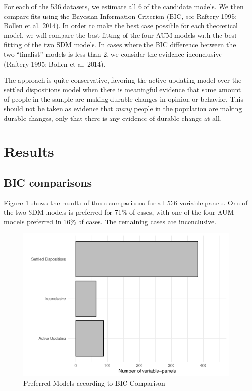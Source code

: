 \documentclass[
  11pt,
]{article}
\begin{document}
For each of the 536 datasets, we estimate all 6 of the candidate models. We then compare fits using the Bayesian Information Criterion (BIC, see Raftery 1995; Bollen et al. 2014). In order to make the best case possible for each theoretical model, we will compare the best-fitting of the four AUM models with the best-fitting of the two SDM models. In cases where the BIC difference between the two ``finalist'' models is less than 2, we consider the evidence inconclusive (Raftery 1995; Bollen et al. 2014).

The approach is quite conservative, favoring the active updating model over the settled dispositions model when there is meaningful evidence that some amount of people in the sample are making durable changes in opinion or behavior. This should not be taken as evidence that \emph{many} people in the population are making durable changes, only that there is any evidence of durable change at all.

\hypertarget{results}{%
\section{Results}\label{results}}

\hypertarget{bic-comparisons}{%
\subsection{BIC comparisons}\label{bic-comparisons}}

Figure \ref{fig:winners} shows the results of these comparisons for all 536 variable-panels. One of the two SDM models is preferred for 71\% of cases, with one of the four AUM models preferred in 16\% of cases. The remaining cases are inconclusive.

\begin{figure}

{\centering \includegraphics{ms_files/figure-latex/winners-1} 

}

\caption{Preferred Models according to BIC Comparison}\label{fig:winners}
\end{figure}
\end{document}
